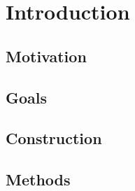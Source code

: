 \newpage
\section{Introduction}

\subsection{Motivation} \label{ssec:motivation}

\subsection{Goals}

\subsection{Construction}


\subsection{Methods} \label{ssec:methods}


